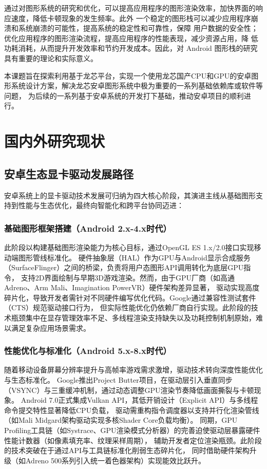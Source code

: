 通过对图形系统的研究和优化，可以提高应用程序的图形渲染效率，加快界面的响应速度，降低卡顿现象的发生频率。此外
一个稳定的图形栈可以减少应用程序崩溃和系统崩溃的可能性，提高系统的稳定性和可靠性，保障
用户数据的安全性；优化应用程序的图形渲染流程，提高应用程序的性能表现，减少资源占用，降
低功耗消耗，从而提升开发效率和节约开发成本。因此，对 Android 图形栈的研究具有重要的理论和实际意义。

本课题旨在探索利用基于龙芯平台，实现一个使用龙芯国产CPU和GPU的安卓图形系统设计方案，解决龙芯安卓图形系统中极为重要的一系列基础依赖库或软件等问题，
为后续的一系列基于安卓系统的开发打下基础，推动安卓项目的顺利进行。

\section{国内外研究现状}

\subsection{安卓生态显卡驱动发展路径}
安卓系统上的显卡驱动技术发展可归纳为四大核心阶段，其演进主线从基础图形支持到性能与生态优化，最终向智能化和跨平台协同迈进：

\subsubsection{基础图形框架搭建（Android 2.x-4.x时代）}

此阶段以构建基础图形渲染能力为核心目标，通过OpenGL ES 1.x/2.0接口实现移动端图形管线标准化\cite{opengles}。
硬件抽象层（HAL）作为GPU与Android显示合成服务（SurfaceFlinger）之间的桥梁，负责将用户态图形API调用转化为底层GPU指令，
支持2D界面绘制与早期3D游戏渲染。然而，由于GPU厂商（如高通Adreno、Arm Mali\cite{mali}、Imagination PowerVR）硬件架构差异显著，
驱动实现高度碎片化，导致开发者需针对不同硬件编写优化代码。Google通过兼容性测试套件（CTS）规范驱动接口行为，
但实际性能优化仍依赖厂商自行实现。此阶段的技术瓶颈集中在显存管理效率不足、多线程渲染支持缺失以及功耗控制机制原始，难以满足复杂应用场景需求。

\subsubsection{性能优化与标准化（Android 5.x-8.x时代）​}

随着移动设备屏幕分辨率提升与高帧率游戏需求激增，驱动技术转向深度性能优化与生态标准化。
Google推出Project Butter项目，在驱动层引入垂直同步（VSYNC）与三重缓冲机制，通过动态调整GPU渲染节奏降低画面撕裂与卡顿现象\cite{GoogleIO2012}。
Android 7.0正式集成Vulkan API，其低开销设计（Explicit API）与多线程命令提交特性显著降低CPU负载，
驱动需重构指令调度器以支持并行化渲染管线（如Mali Midgard架构驱动实现多核Shader Core负载均衡）\cite{vulkan}。
同期，GPU Profiling工具链（如Systrace、GPU渲染模式分析器）的完善迫使驱动层暴露硬件性能计数器（如像素填充率、纹理采样周期），
辅助开发者定位渲染瓶颈。此阶段的技术突破在于通过API与工具链标准化削弱生态碎片化，
同时借助硬件架构升级（如Adreno 500系列引入统一着色器架构\cite{adreno}）实现能效比跃升。

